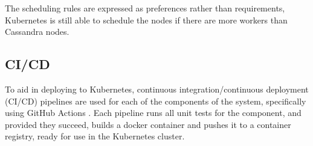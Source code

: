 The scheduling rules are expressed as preferences rather than requirements, Kubernetes is still able to schedule the nodes if there are more workers than Cassandra nodes.

\subsection{CI/CD}
To aid in deploying to Kubernetes, continuous integration/continuous deployment (CI/CD) pipelines are used for each of the components of the system, specifically using GitHub Actions . Each pipeline runs all unit tests for the component, and provided they succeed, builds a docker container and pushes it to a container registry, ready for use in the Kubernetes cluster.

